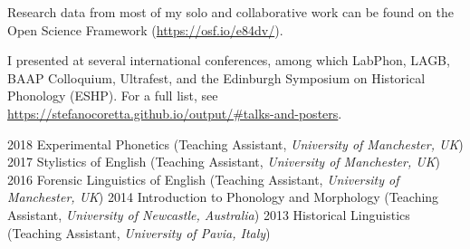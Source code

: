 \documentclass[9pt]{developercv} %
\begin{document}


\begin{entrylist}
	\entry
		{\hspace{1em}}
		{\textnormal{Research data from most of my solo and collaborative work can be found on the Open Science Framework (\url{https://osf.io/e84dv/}).}}
		{}
		{}
\end{entrylist}



\begin{entrylist}
	\entry
		{\hspace{1em}}
		{\textnormal{I presented at several international conferences, among which LabPhon, LAGB, BAAP Colloquium, Ultrafest, and the Edinburgh Symposium on Historical Phonology (ESHP). For a full list, see \url{https://stefanocoretta.github.io/output/\#talks-and-posters}.}}
		{}
		{}
\end{entrylist}



\begin{entrylist}
	\entry
		{2018}
		{Experimental Phonetics \textnormal{(Teaching Assistant, \textit{University of Manchester, UK})}}
		{}
		{}
	\entry
		{2017}
		{Stylistics of English \textnormal{(Teaching Assistant, \textit{University of Manchester, UK})}}
		{}
		{}
	\entry
		{2016}
		{Forensic Linguistics of English \textnormal{(Teaching Assistant, \textit{University of Manchester, UK})}}
		{}
		{}
	\entry
		{2014}
		{Introduction to Phonology and Morphology \textnormal{(Teaching Assistant, \textit{University of Newcastle, Australia})}}
		{}
		{}
	\entry
		{2013}
		{Historical Linguistics \textnormal{(Teaching Assistant, \textit{University of Pavia, Italy})}}
		{}
		{}
\end{entrylist}

\end{document}
